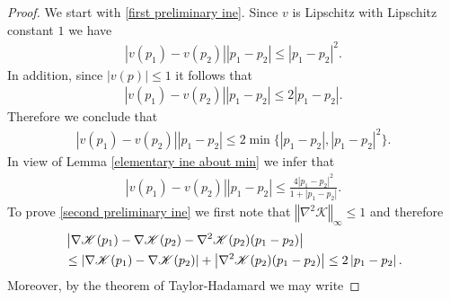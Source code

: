 \documentclass[11pt,reqno]{amsart}
\numberwithin{equation}{section}
\begin{document}
\begin{proof}
We start with \eqref{first preliminary ine}. Since $v$ is Lipschitz with Lipschitz constant $1$ we have  
\begin{align*}
\left\vert v(p_{1})-v(p_{2})\right\vert\left\vert  p_{1}-p_{2}\right\vert\leq \left\vert p_{1}-p_{2}\right\vert^{2}.      
\end{align*}
In addition, since $\left\vert v(p)\right\vert\leq 1 $ it follows that 
\begin{align*}
\left\vert v(p_{1})-v(p_{2})\right\vert \left\vert p_{1}-p_{2}\right\vert\leq 2\left\vert p_{1}-p_{2}\right\vert.      
\end{align*}
Therefore we conclude that 
\begin{align*}
\left\vert v(p_{1})-v(p_{2})\right\vert \left\vert  p_{1}-p_{2}\right\vert\leq 2\min\{\left\vert p_{1}-p_{2}\right\vert,\left\vert p_{1}-p_{2}\right\vert^{2}\}. \end{align*}
In view of Lemma \ref{elementary ine about min} we infer that 
\begin{align*}
\left\vert v(p_{1})-v(p_{2})\right\vert \left\vert  p_{1}-p_{2}\right\vert\leq \frac{4\left\vert p_{1}-p_{2}\right\vert^{2}}{1+\left\vert p_{1}-p_{2}\right\vert}.      
\end{align*}
To prove \eqref{second preliminary ine} we first note that  $\left\Vert \nabla^{2}\mathscr{K}\right\Vert_{\infty}\leq 1$ and therefore 
\begin{align}
&\left\vert \nabla\mathscr{K}(p_{1})-\nabla\mathscr{K}(p_{2})-\nabla^{2}\mathscr{K}(p_{2})(p_{1}-p_{2})\right\vert \notag\\
&\leq \left\vert \nabla \mathscr{K}(p_{1})-\nabla \mathscr{K}(p_{2})\right\vert+\left\vert \nabla^{2} \mathscr{K}(p_{2})(p_{1}-p_{2})\right\vert\leq 2\left\vert p_{1}-p_{2}\right\vert. \label{linearbound}       
\end{align}
Moreover, by the theorem of Taylor-Hadamard we may write 


\end{proof}
\end{document}
